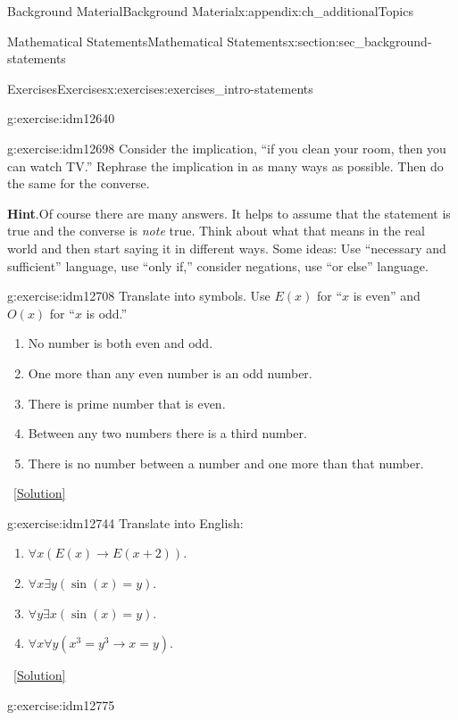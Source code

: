 \documentclass[oneside,10pt,]{book}
\numberwithin{equation}{chapter}
\def\imp{\rightarrow}
\begin{document}
\begin{appendixptx}{Background Material}{}{Background Material}{}{}{x:appendix:ch_additionalTopics}
\begin{sectionptx}{Mathematical Statements}{}{Mathematical Statements}{}{}{x:section:sec_background-statements}
\begin{exercises-subsection}{Exercises}{}{Exercises}{}{}{x:exercises:exercises_intro-statements}
\begin{divisionexercise}{5}{}{}{g:exercise:idm12640}
\begin{enumerate}[label=(\alph*)]
\end{enumerate}
\end{divisionexercise}%
\begin{divisionexercise}{6}{}{}{g:exercise:idm12698}%
Consider the implication, ``if you clean your room, then you can watch TV.'' Rephrase the implication in as many ways as possible. Then do the same for the converse.%
\par\smallskip%
\noindent\textbf{Hint}.\hypertarget{g:hint:idm12702}{}\quad{}Of course there are many answers. It helps to assume that the statement is true and the converse is \emph{note} true. Think about what that means in the real world and then start saying it in different ways. Some ideas: Use ``necessary and sufficient'' language, use ``only if,'' consider negations, use ``or else'' language.%
\end{divisionexercise}%
\begin{divisionexercise}{7}{}{}{g:exercise:idm12708}%
Translate into symbols. Use \(E(x)\) for ``\(x\) is even'' and \(O(x)\) for ``\(x\) is odd.''%
%
\begin{enumerate}[label=(\alph*)]
\item{}No number is both even and odd.%
\item{}One more than any even number is an odd number.%
\item{}There is prime number that is even.%
\item{}Between any two numbers there is a third number.%
\item{}There is no number between a number and one more than that number.%
\end{enumerate}
\qquad~\hfill{\tiny\hyperlink{g:solution:idm12728-main}{[Solution]}}\end{divisionexercise}%
\begin{divisionexercise}{8}{}{}{g:exercise:idm12744}%
Translate into English:%
\begin{enumerate}[label=(\alph*)]
\item{}\(\forall x (E(x) \imp E(x +2))\).%
\item{}\(\forall x \exists y (\sin(x) = y)\).%
\item{}\(\forall y \exists x (\sin(x) = y)\).%
\item{}\(\forall x \forall y (x^3 = y^3 \imp x = y)\).%
\end{enumerate}
%
\qquad~\hfill{\tiny\hyperlink{g:solution:idm12756-main}{[Solution]}}\end{divisionexercise}%
\begin{divisionexercise}{9}{}{}{g:exercise:idm12775}%

\end{divisionexercise}
\end{exercises-subsection}
\end{sectionptx}
\end{appendixptx}
\end{document}
